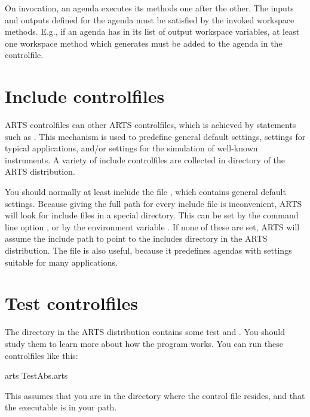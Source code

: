 On invocation, an agenda executes its methods one after the
other. The inputs and outputs defined for the agenda must be satisfied
by the invoked workspace methods. E.g., if an agenda has
 in its list of output workspace
variables, at least one workspace method which generates
 must be added to the agenda in the
controlfile.

\section{Include controlfiles}

ARTS controlfiles can \emph{} other ARTS
controlfiles, which is achieved by statements such as
.  This mechanism is used to
predefine general default settings, settings for typical applications,
and/or settings for the simulation of well-known instruments.  A
variety of include controlfiles are collected in directory
 of the ARTS distribution.

You should normally at least include the file , which
contains general default settings. Because giving the full path for every
include file is inconvenient, ARTS will look for include files in a special
directory. This can be set by the command line option , or by the environment variable
. If none of these are set, ARTS
will assume the include path to point to the includes directory in the ARTS
distribution.
The file  is also useful, because it predefines
agendas with settings suitable for many applications.


\section{Test controlfiles}

The directory  in the ARTS distribution contains some
test and .  You should study them to learn more about how
the program works. You can run these controlfiles like this:
\begin{code}
  arts TestAbs.arts
\end{code}
This assumes that you are in the directory where the control
file resides, and that the  executable is in
your path. 

